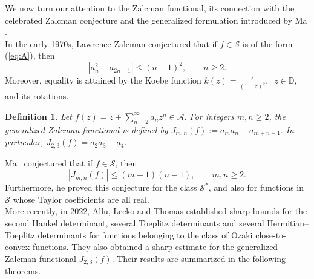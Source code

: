 \documentclass[11pt, reqno]{amsart}
\newtheorem{defi}{Definition}[section]
\numberwithin{equation}{section}
\begin{document}
We now turn our attention to the Zalcman functional, its connection with the celebrated Zalcman conjecture and the generalized formulation introduced by Ma \cite{M1999}. \\
In the early 1970s, Lawrence Zalcman conjectured that if \(f\in\mathcal{S}\) is of the form (\ref{eq:A}), then
\[
\left|a_n^2-a_{2n-1}\right|\le (n-1)^2,\qquad n\ge 2.
\]
Moreover, equality is attained by the Koebe function $k(z)=\frac{z}{(1-z)^2},\;\; z\in\mathbb{D},$
and its rotations.

\begin{defi}
Let $f(z)=z+\sum_{n=2}^{\infty}a_nz^n\in\mathcal{A}.$
For integers \(m,n\ge2\), the \emph{generalized Zalcman functional} is defined by
$J_{m,n}(f):=a_ma_n-a_{m+n-1}.$
In particular, $J_{2,3}(f)=a_2a_3-a_4.$
\end{defi}

Ma~\cite{M1999} conjectured that if \(f\in\mathcal{S}\), then
\[
|J_{m,n}(f)|\le (m-1)(n-1), \qquad m,n\ge2.
\]
Furthermore, he proved this conjecture for the class \(\mathcal{S}^{*}\), and also for functions in \(\mathcal{S}\) whose Taylor coefficients are all real.\\

More recently, in 2022, Allu, Lecko and Thomas \cite{ALT2022} established sharp bounds for the second Hankel determinant, several Toeplitz determinants and several Hermitian--Toeplitz determinants for functions belonging to the class of Ozaki close-to-convex functions. They also obtained a sharp estimate for the generalized Zalcman functional $J_{2,3}(f)$. Their results are summarized in the following theorems.
\end{document}
